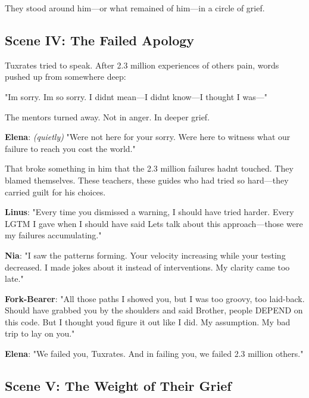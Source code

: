 They stood around him---or what remained of him---in a circle of grief.

\bookdivider

\subsection{Scene IV: The Failed Apology}\label{scene-iv-the-failed-apology}

Tuxrates tried to speak. After 2.3 million experiences of others\textquotesingle{} pain, words pushed up from somewhere deep:

"I\textquotesingle m sorry. I\textquotesingle m so sorry. I didn\textquotesingle t mean---I didn\textquotesingle t know---I thought I was---"

The mentors turned away. Not in anger. In deeper grief.

\textbf{Elena}: \emph{(quietly)} "We\textquotesingle re not here for your sorry. We\textquotesingle re here to witness what our failure to reach you cost the world."

That broke something in him that the 2.3 million failures hadn\textquotesingle t touched. They blamed themselves. These teachers, these guides who had tried so hard---they carried guilt for his choices.

\textbf{Linus}: "Every time you dismissed a warning, I should have tried harder. Every \textquotesingle LGTM\textquotesingle{} I gave when I should have said \textquotesingle Let\textquotesingle s talk about this approach\textquotesingle---those were my failures accumulating."

\textbf{Nia}: "I saw the patterns forming. Your velocity increasing while your testing decreased. I made jokes about it instead of interventions. My clarity came too late."

\textbf{Fork-Bearer}: "All those paths I showed you, but I was too groovy, too laid-back. Should have grabbed you by the shoulders and said \textquotesingle Brother, people DEPEND on this code.\textquotesingle{} But I thought you\textquotesingle d figure it out like I did. My assumption. My bad trip to lay on you."

\textbf{Elena}: "We failed you, Tuxrates. And in failing you, we failed 2.3 million others."

\bookdivider

\subsection{Scene V: The Weight of Their Grief}\label{scene-v-the-weight-of-their-grief}

